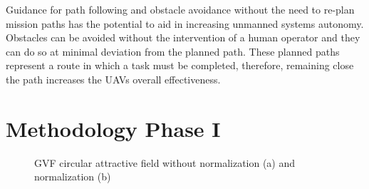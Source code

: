 \documentclass[numbered,pdftex]{ohio-etd}
\begin{document}
Guidance for path following and obstacle avoidance without the need to re-plan mission paths has the potential to aid in increasing unmanned systems autonomy. Obstacles can be avoided without the intervention of a human operator and they can do so at minimal deviation from the planned path. These planned paths represent a route in which a task must be completed, therefore, remaining close the path increases the UAVs overall effectiveness.


\appendix
\chapter{Methodology Phase I}

\begin{figure}[H]
	\begin{subfigmatrix}{2}%
		\centering	
		\hspace*{0mm}
	\end{subfigmatrix}
	\caption{GVF circular attractive field without normalization (a) and normalization (b)}
	\label{fig:gvfCircAttractive}
\end{figure}
\end{document}
